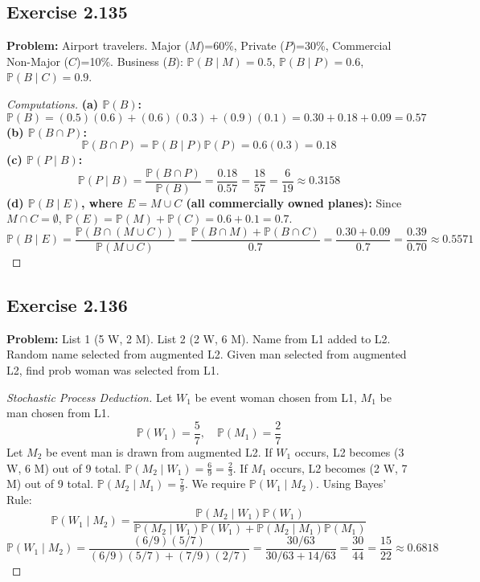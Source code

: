 \documentclass[12pt]{article}
\theoremstyle{definition}
\theoremstyle{remark}
\newcommand{\Pbb}{\mathbb{P}}
\begin{document}
\subsection*{Exercise 2.135}
\textbf{Problem:} Airport travelers. Major ($M$)=60\%, Private ($P$)=30\%, Commercial Non-Major ($C$)=10\%. Business ($B$): $\Pbb(B \mid M)=0.5$, $\Pbb(B \mid P)=0.6$, $\Pbb(B \mid C)=0.9$.
\begin{proof}[Computations]
\textbf{(a) $\Pbb(B)$:}
\[ \Pbb(B) = (0.5)(0.6) + (0.6)(0.3) + (0.9)(0.1) = 0.30 + 0.18 + 0.09 = 0.57 \]
\textbf{(b) $\Pbb(B \cap P)$:}
\[ \Pbb(B \cap P) = \Pbb(B \mid P)\Pbb(P) = 0.6(0.3) = 0.18 \]
\textbf{(c) $\Pbb(P \mid B)$:}
\[ \Pbb(P \mid B) = \frac{\Pbb(B \cap P)}{\Pbb(B)} = \frac{0.18}{0.57} = \frac{18}{57} = \frac{6}{19} \approx 0.3158 \]
\textbf{(d) $\Pbb(B \mid E)$, where $E = M \cup C$ (all commercially owned planes):}
Since $M \cap C = \emptyset$, $\Pbb(E) = \Pbb(M) + \Pbb(C) = 0.6 + 0.1 = 0.7$.
\[ \Pbb(B \mid E) = \frac{\Pbb(B \cap (M \cup C))}{\Pbb(M \cup C)} = \frac{\Pbb(B \cap M) + \Pbb(B \cap C)}{0.7} = \frac{0.30 + 0.09}{0.7} = \frac{0.39}{0.70} \approx 0.5571 \]
\end{proof}

\subsection*{Exercise 2.136}
\textbf{Problem:} List 1 (5 W, 2 M). List 2 (2 W, 6 M). Name from L1 added to L2. Random name selected from augmented L2. Given man selected from augmented L2, find prob woman was selected from L1.
\begin{proof}[Stochastic Process Deduction]
Let $W_1$ be event woman chosen from L1, $M_1$ be man chosen from L1.
\[ \Pbb(W_1) = \frac{5}{7}, \quad \Pbb(M_1) = \frac{2}{7} \]
Let $M_2$ be event man is drawn from augmented L2.
If $W_1$ occurs, L2 becomes (3 W, 6 M) out of 9 total. $\Pbb(M_2 \mid W_1) = \frac{6}{9} = \frac{2}{3}$.
If $M_1$ occurs, L2 becomes (2 W, 7 M) out of 9 total. $\Pbb(M_2 \mid M_1) = \frac{7}{9}$.
We require $\Pbb(W_1 \mid M_2)$. Using Bayes' Rule:
\[ \Pbb(W_1 \mid M_2) = \frac{\Pbb(M_2 \mid W_1)\Pbb(W_1)}{\Pbb(M_2 \mid W_1)\Pbb(W_1) + \Pbb(M_2 \mid M_1)\Pbb(M_1)} \]
\[ \Pbb(W_1 \mid M_2) = \frac{(6/9)(5/7)}{(6/9)(5/7) + (7/9)(2/7)} = \frac{30/63}{30/63 + 14/63} = \frac{30}{44} = \frac{15}{22} \approx 0.6818 \]
\end{proof}
\end{document}
